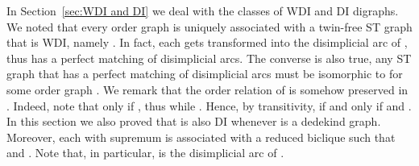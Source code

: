 \documentclass[a4paper,11pt]{article}
\begin{document}
In Section~\ref{sec:WDI and DI} we deal with the classes of WDI and DI digraphs.  We noted that every order graph  is uniquely associated with a twin-free ST graph  that is WDI, namely .  In fact, each  gets transformed into the disimplicial arc  of , thus  has a perfect matching of disimplicial arcs.  The converse is also true, any ST graph that has a perfect matching of disimplicial arcs must be isomorphic to  for some order graph .  We remark that the order relation  of  is somehow preserved in .  Indeed, note that  only if , thus  while .  Hence, by transitivity,  if and only if  and .  In this section we also proved that  is also DI whenever  is a dedekind graph.  Moreover, each  with supremum  is associated with a reduced biclique  such that  and .   Note that, in particular,  is the disimplicial arc of .  

\newcommand{\doi}[1]{doi: \href{http://dx.doi.org/#1}{\dodoi{#1}}}
\newcommand{\dodoi}{\begingroup \urlstyle{rm}\Url}
\end{document}
